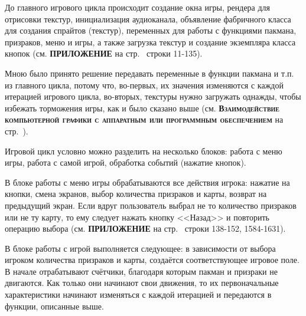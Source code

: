 До главного игрового цикла происходит создание окна игры, рендера для отрисовки текстур, инициализация аудиоканала, объявление фабричного класса для создания спрайтов (текстур), переменных для работы с функциями пакмана, призраков, меню и игры, а также загрузка текстур и создание экземпляра класса кнопок (см. \textbf{\textsc{ПРИЛОЖЕНИЕ}} на стр.~\pageref{code:main} строки 11-135).

Мною было принято решение передавать переменные в функции пакмана и т.п. из главного цикла, потому что, во-первых, их значения изменяются с каждой итерацией игрового цикла, во-вторых, текстуры нужно загружать однажды, чтобы избежать торможения игры, как и было сказано выше (см. \textbf{\textsc{Взаимодействие компьютерной графики с аппаратным или программным обеспечением}} на стр.~\pageref{sec:ch02/sec01/sub02}).

Игровой цикл условно можно разделить на несколько блоков: работа с меню игры, работа с самой игрой, обработка событий (нажатие кнопок). 

В блоке работы с меню игры обрабатываются все действия игрока: нажатие на кнопки, смена экранов, выбор количества призраков и карты, возврат на предыдущий экран. Если вдруг пользователь выбрал не то количество призраков или не ту карту, то ему следует нажать кнопку <<Назад>> и повторить операцию выбора (см. \textbf{\textsc{ПРИЛОЖЕНИЕ}} на стр.~\pageref{code:main} строки 138-152, 1584-1631). 

В блоке работы с игрой выполняется следующее: в зависимости от выбора игроком количества призраков и карты, создаётся соответствующее игровое поле. В начале отрабатывают счётчики, благодаря которым пакман и призраки не двигаются. Как только они начинают свои движения, то их первоначальные характеристики начинают изменяться с каждой итерацией и передаются в функции, описанные выше. 

